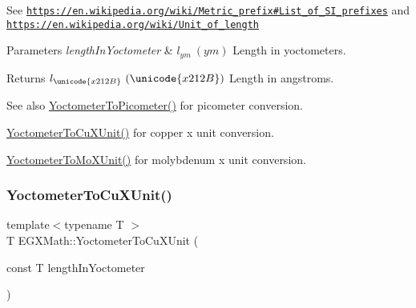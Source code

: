 See \href{https://en.wikipedia.org/wiki/Metric_prefix#List_of_SI_prefixes}{\tt https\+://en.\+wikipedia.\+org/wiki/\+Metric\+\_\+prefix\#\+List\+\_\+of\+\_\+\+S\+I\+\_\+prefixes} and \href{https://en.wikipedia.org/wiki/Unit_of_length}{\tt https\+://en.\+wikipedia.\+org/wiki/\+Unit\+\_\+of\+\_\+length} 
\begin{DoxyParams}{Parameters}
{\em length\+In\+Yoctometer} & $ l_{ym}\ (ym)$ Length in yoctometers. \\
\hline
\end{DoxyParams}
\begin{DoxyReturn}{Returns}
$ l_{\unicode{x212B}}\ (\unicode{x212B})$ Length in angstroms. 
\end{DoxyReturn}
\begin{DoxySeeAlso}{See also}
\mbox{\hyperlink{group___e_g_x_math-_conversions-_length_conversions-_yoctometer-_s_i_gab621b78b78d6776131912bd6038901b9}{Yoctometer\+To\+Picometer()}} for picometer conversion. 

\mbox{\hyperlink{group___e_g_x_math-_conversions-_length_conversions-_yoctometer-_non-_s_i_ga0266faf325ea86fef13391fb6e792ff8}{Yoctometer\+To\+Cu\+X\+Unit()}} for copper x unit conversion. 

\mbox{\hyperlink{group___e_g_x_math-_conversions-_length_conversions-_yoctometer-_non-_s_i_ga6a6a1fb3ecc97e377fc728c03327048e}{Yoctometer\+To\+Mo\+X\+Unit()}} for molybdenum x unit conversion. 
\end{DoxySeeAlso}
\mbox{\label{group___e_g_x_math-_conversions-_length_conversions-_yoctometer-_non-_s_i_ga0266faf325ea86fef13391fb6e792ff8}} 
\subsubsection{\texorpdfstring{Yoctometer\+To\+Cu\+X\+Unit()}{YoctometerToCuXUnit()}}
{\footnotesize\ttfamily template$<$typename T $>$ \\
T E\+G\+X\+Math\+::\+Yoctometer\+To\+Cu\+X\+Unit (\begin{DoxyParamCaption}\item[{const T}]{length\+In\+Yoctometer }\end{DoxyParamCaption})}



